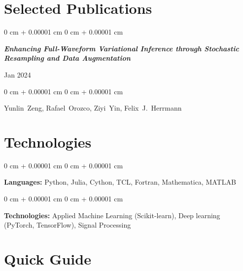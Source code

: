 \documentclass[10pt, letterpaper]{article}
\newenvironment{onecolentry}{
    \begin{adjustwidth}{
        0 cm + 0.00001 cm
    }{
        0 cm + 0.00001 cm
    }
}{
    \end{adjustwidth}
} %
\newenvironment{twocolentry}[2][]{
    \onecolentry
    \def\secondColumn{#2}
    \setcolumnwidth{\fill, 4.5 cm}
    \begin{paracol}{2}
}{
    \switchcolumn \raggedleft \secondColumn
    \end{paracol}
    \endonecolentry
} %
\begin{document}
    
    \section{Selected Publications}



        
        \begin{samepage}
            \begin{twocolentry}{
                Jan 2024
            }
                \textbf{\textit{Enhancing Full-Waveform Variational Inference through Stochastic Resampling and Data Augmentation}}
            \end{twocolentry}

            \vspace{0.10 cm}
            
            \begin{onecolentry}
                \mbox{Yunlin Zeng}, \mbox{Rafael Orozco}, \mbox{Ziyi Yin}, \mbox{Felix J. Herrmann}

                
        \end{onecolentry}
        \end{samepage}


    
    \section{Technologies}



        
        \begin{onecolentry}
            \textbf{Languages:} Python, Julia, Cython, TCL, Fortran, Mathematica, MATLAB
        \end{onecolentry}

        \vspace{0.2 cm}

        \begin{onecolentry}
            \textbf{Technologies:} Applied Machine Learning (Scikit-learn), Deep learning (PyTorch, TensorFlow), Signal Processing
        \end{onecolentry}


    
    \section{Quick Guide}
\end{document}
